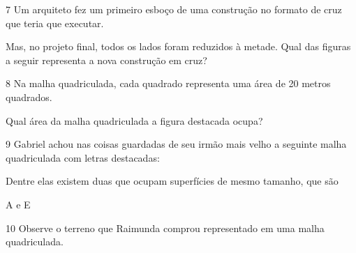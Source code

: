 {\num{7} Um arquiteto fez um primeiro esboço de uma construção no formato de
cruz que teria que executar.


Mas, no projeto final, todos os lados foram reduzidos à metade. Qual das
figuras a seguir representa a nova construção em cruz?



\num{8} Na malha quadriculada, cada quadrado representa uma área de
20 metros quadrados.


Qual área da malha quadriculada a figura destacada ocupa?



\num{9} Gabriel achou nas coisas guardadas de seu irmão mais velho a
seguinte malha quadriculada com letras destacadas:


Dentre elas existem duas que ocupam superfícies de mesmo tamanho, que são

  A e E



\num{10} Observe o terreno que Raimunda comprou representado em uma malha
quadriculada.


}
